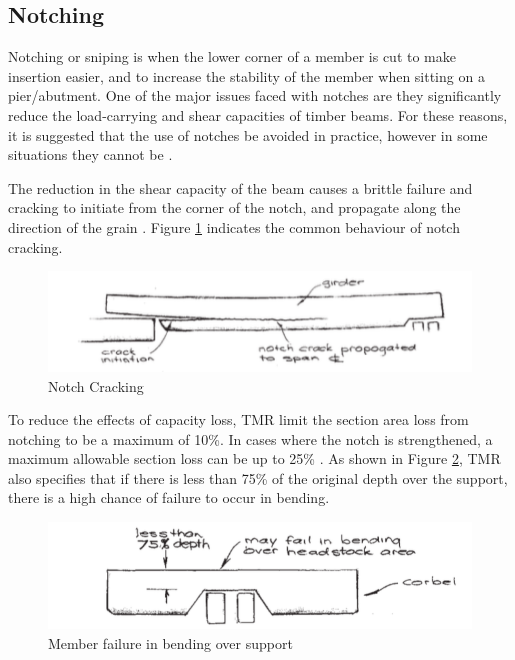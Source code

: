 \documentclass[11pt,a4paper]{article}
\numberwithin{equation}{subsection}
\begin{document}
	\subsection{Notching}
	Notching or sniping is when the lower corner of a member is cut to make insertion easier, and to increase the stability of the member when sitting on a pier/abutment. One of the major issues faced with notches are they significantly reduce the load-carrying and shear capacities of timber beams. For these reasons, it is suggested that the use of notches be avoided in practice, however in some situations they cannot be \cite{jockwer_state---art_2013,jockwer_structural_2014}.
	
	\vspace*{\baselineskip}
	
	\noindent
    The reduction in the shear capacity of the beam causes a brittle failure and cracking to initiate from the corner of the notch, and propagate along the direction of the grain \cite{jockwer_state---art_2013,_timber_2005}. Figure \ref{fig:Notch_Crack} indicates the common behaviour of notch cracking.
    
       	\begin{figure}[h]
       		\includegraphics[scale=0.9]{Shear_Failure_Notching}
       		\caption{Notch Cracking \cite{_timber_2005}}
       		\label{fig:Notch_Crack}
       	\end{figure}
       
	\noindent
	To reduce the effects of capacity loss, TMR limit the section area loss from notching to be a maximum of 10\%. In cases where the notch is strengthened, a maximum allowable section loss can be up to 25\% \cite{_timber_2005}. As shown in Figure \ref{fig:Bending}, TMR also specifies that if there is less than 75\% of the original depth over the support, there is a high chance of failure to occur in bending. 
	
	       	\begin{figure}[h]
	       		\includegraphics[scale=0.7]{Bending_Fail}
	       		\caption{Member failure in bending over support \cite{_timber_2005}}
	       		\label{fig:Bending}
	       	\end{figure}
	
\end{document}

